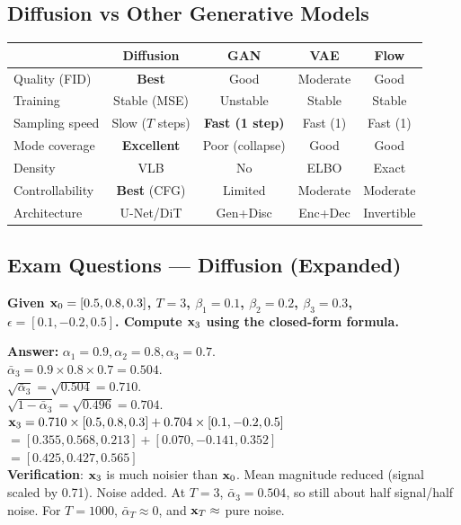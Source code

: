 \subsection{Diffusion vs Other Generative Models}
\begin{center}\small
\begin{tabular}{lcccc}\toprule
& \textbf{Diffusion} & \textbf{GAN} & \textbf{VAE} & \textbf{Flow} \\\midrule
Quality (FID) & \textbf{Best} & Good & Moderate & Good \\
Training & Stable (MSE) & Unstable & Stable & Stable \\
Sampling speed & Slow ($T$ steps) & \textbf{Fast (1 step)} & Fast (1) & Fast (1) \\
Mode coverage & \textbf{Excellent} & Poor (collapse) & Good & Good \\
Density & VLB & No & ELBO & Exact \\
Controllability & \textbf{Best} (CFG) & Limited & Moderate & Moderate \\
Architecture & U-Net/DiT & Gen+Disc & Enc+Dec & Invertible \\
\bottomrule
\end{tabular}
\end{center}

\subsection{Exam Questions — Diffusion (Expanded)}

\begin{examq}
\textbf{Given $\mathbf{x}_0 = [0.5, 0.8, 0.3]$, $T = 3$, $\beta_1 = 0.1$, $\beta_2 = 0.2$, $\beta_3 = 0.3$, $\epsilon = [0.1, -0.2, 0.5]$. Compute $\mathbf{x}_3$ using the closed-form formula.}

\textbf{Answer:}
$\alpha_1 = 0.9, \alpha_2 = 0.8, \alpha_3 = 0.7$.\\
$\bar\alpha_3 = 0.9 \times 0.8 \times 0.7 = 0.504$.\\
$\sqrt{\bar\alpha_3} = \sqrt{0.504} = 0.710$.\\
$\sqrt{1-\bar\alpha_3} = \sqrt{0.496} = 0.704$.\\
$\mathbf{x}_3 = 0.710 \times [0.5, 0.8, 0.3] + 0.704 \times [0.1, -0.2, 0.5]$\\
$= [0.355, 0.568, 0.213] + [0.070, -0.141, 0.352]$\\
$= \boxed{[0.425, 0.427, 0.565]}$\\
\textbf{Verification}: $\mathbf{x}_3$ is much noisier than $\mathbf{x}_0$. Mean magnitude reduced (signal scaled by 0.71). Noise added. At $T = 3$, $\bar\alpha_3 = 0.504$, so still about half signal/half noise. For $T = 1000$, $\bar\alpha_T \approx 0$, and $\mathbf{x}_T \approx$ pure noise.
\end{examq}

